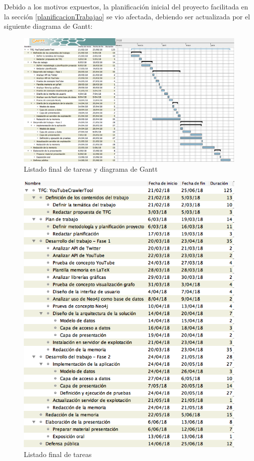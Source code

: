 \documentclass[11pt,a4paper]{article}
\begin{document}
\begin{itemize}
Debido a los motivos expuestos, la planificación inicial del proyecto facilitada en la sección \ref{planificacionTrabajao} se vio afectada, debiendo ser actualizada por el siguiente diagrama de Gantt:

\begin{figure}[H]
\centering
\includegraphics[scale=0.20]{planificacion/planificacion2.png}
\caption{Listado final de tareas y diagrama de Gantt}
\end{figure}

\begin{figure}[H]
\centering
\includegraphics[scale=0.35]{planificacion/listado-tareas2.png}
\caption{Listado final de tareas}
\end{figure}

\end{itemize}
\end{document}
